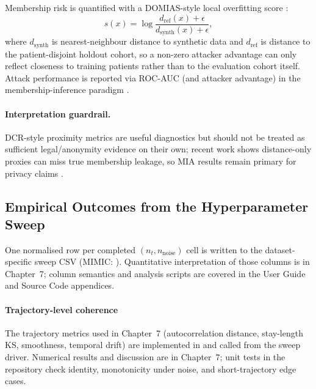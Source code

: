 Membership risk is quantified with a DOMIAS-style local overfitting score \cite{breugel2023domias}:
\begin{equation}
s(x)=\log\frac{d_{\text{ref}}(x)+\epsilon}{d_{\text{synth}}(x)+\epsilon},
\end{equation}
where $d_{\text{synth}}$ is nearest-neighbour distance to synthetic data and $d_{\text{ref}}$ is distance to the patient-disjoint holdout cohort, so a non-zero attacker advantage can only reflect closeness to training patients rather than to the evaluation cohort itself.
Attack performance is reported via ROC-AUC (and attacker advantage) in the membership-inference paradigm \cite{shokri2017membership}.

\paragraph{Interpretation guardrail.}
DCR-style proximity metrics are useful diagnostics but should not be treated as sufficient legal/anonymity evidence on their own; recent work shows distance-only proxies can miss true membership leakage, so MIA results remain primary for privacy claims \cite{yao2025dcrdelusion}.

\subsection{Empirical Outcomes from the Hyperparameter Sweep}

One normalised row per completed $(n_t, n_{\text{noise}})$ cell is written to the dataset-specific sweep CSV (MIMIC: ). Quantitative interpretation of those columns is in Chapter~7; column semantics and analysis scripts are covered in the User Guide and Source Code appendices.

\paragraph{Trajectory-level coherence}
\label{sec:trajectory-coherence}

The trajectory metrics used in Chapter~7 (autocorrelation distance, stay-length KS, smoothness, temporal drift) are implemented in  and called from the sweep driver. Numerical results and discussion are in Chapter~7; unit tests in the repository check identity, monotonicity under noise, and short-trajectory edge cases.

